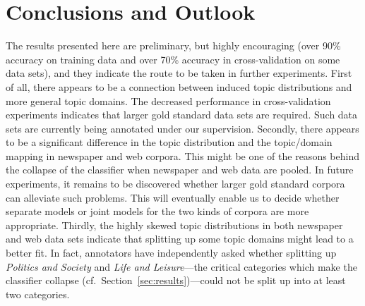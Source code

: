 \documentclass[11pt]{article}
\begin{document}
\section{Conclusions and Outlook}
\label{sec:conclusions}

The results presented here are preliminary, but highly encouraging (over 90\% accuracy on training data and over 70\% accuracy in cross-validation on some data sets), and they indicate the route to be taken in further experiments.
First of all, there appears to be a connection between induced topic distributions and more general topic domains.
The decreased performance in cross-validation experiments indicates that larger gold standard data sets are required.
Such data sets are currently being annotated under our supervision.
Secondly, there appears to be a significant difference in the topic distribution and the topic\slash domain mapping in newspaper and web corpora.
This might be one of the reasons behind the collapse of the classifier when newspaper and web data are pooled.
In future experiments, it remains to be discovered whether larger gold standard corpora can alleviate such problems.
This will eventually enable us to decide whether separate models or joint models for the two kinds of corpora are more appropriate.
Thirdly, the highly skewed topic distributions in both newspaper and web data sets indicate that splitting up some topic domains might lead to a better fit.
In fact, annotators have independently asked whether splitting up \textit{Politics and Society} and \textit{Life and Leisure}---the critical categories which make the classifier collapse (cf.\ Section~\ref{sec:results})---could not be split up into at least two categories.



\end{document}
